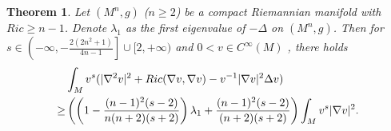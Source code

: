 \documentclass[10pt,a4paper]{amsart}
\newtheorem{theorem}{Theorem}
\begin{document}
 \begin{theorem}\label{thm. modified weighted Gamma2}
    Let $(M^n,g)$ ($n\geq 2$) be a compact Riemannian manifold with $Ric\geq n-1$. 
    Denote $\lambda_1$ as the first eigenvalue of $-\Delta $ on $(M^n,g)$.
    Then for $s\in\left(-\infty,-\frac{2(2n^2+1)}{4n-1}\right]
    \cup[2,+\infty)$ and $0<v\in C^{\infty}(M)$ , there holds
    \begin{align}
        &\int_M v^s(|\nabla^2 v|^2+Ric(\nabla v,\nabla v)-v^{-1}|\nabla v|^2\Delta v)\notag\\
        \geq &
        \left(\left(1-\frac{(n-1)^2(s-2)}{n(n+2)(s+2)}
        \right)\lambda_1
        +\frac{(n-1)^2(s-2)}{(n+2)(s+2)}
        \right)
        \int_M v^s|\nabla v|^2.\label{ineq. interpolated BE Gamma2}
    \end{align}
\end{theorem}
\end{document}
